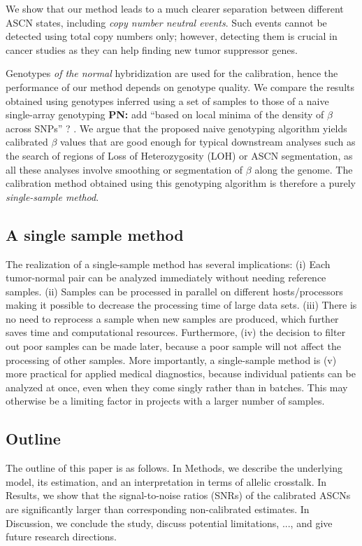 \documentclass[10pt]{bmc_article}
\newenvironment{bmcformat}{\fussy\setboolean{publ}{true}}{\fussy}
\newenvironment{PN}{\color{blue}\textbf{PN:}}{}
\begin{document}
\begin{bmcformat}
We show that our method leads to a much clearer separation between different ASCN states, including \emph{copy number neutral events}. Such events cannot be detected using total copy numbers only; however, detecting them is crucial in cancer studies as they can help finding new tumor suppressor genes.

Genotypes \emph{of the normal} hybridization are used for the calibration, hence the performance of our method depends on genotype quality. We compare the results obtained using genotypes inferred using a set of samples to those of a naive single-array genotyping
\begin{PN}
  add ``based on local minima of the density of $\beta$ across SNPs'' ?
\end{PN}. We argue that the proposed naive genotyping algorithm yields calibrated $\beta$ values that are good enough for typical downstream analyses such as the search of regions of Loss of Heterozygosity (LOH) or ASCN segmentation, as all these analyses  involve smoothing or segmentation of $\beta$ along the genome. The calibration method obtained using this genotyping algorithm is therefore a purely \emph{single-sample method}.


\subsection*{A single sample method}
The realization of a single-sample method has several implications:
(i) Each tumor-normal pair can be analyzed immediately without needing reference samples.
(ii) Samples can be processed in parallel on different hosts/processors making it possible to decrease the processing time of large data sets.
(iii) There is no need to reprocess a sample when new samples are produced, which further saves time and computational resources.
Furthermore, (iv) the decision to filter out poor samples can be made later, because a poor sample will not affect the processing of other samples.
More importantly, a single-sample method is
(v) more practical for applied medical diagnostics, because individual patients can be analyzed at once, even when they come singly rather than in batches.  This may otherwise be a limiting factor in projects with a larger number of samples.

\subsection*{Outline}
The outline of this paper is as follows. 
In Methods, we describe the underlying model, its estimation, and an interpretation in terms of allelic crosstalk. In Results, we show that the signal-to-noise ratios (SNRs) of the calibrated ASCNs are significantly larger than corresponding non-calibrated estimates.
In Discussion, we conclude the study, discuss potential limitations, ..., and give future research directions.



\end{bmcformat}
\end{document}

